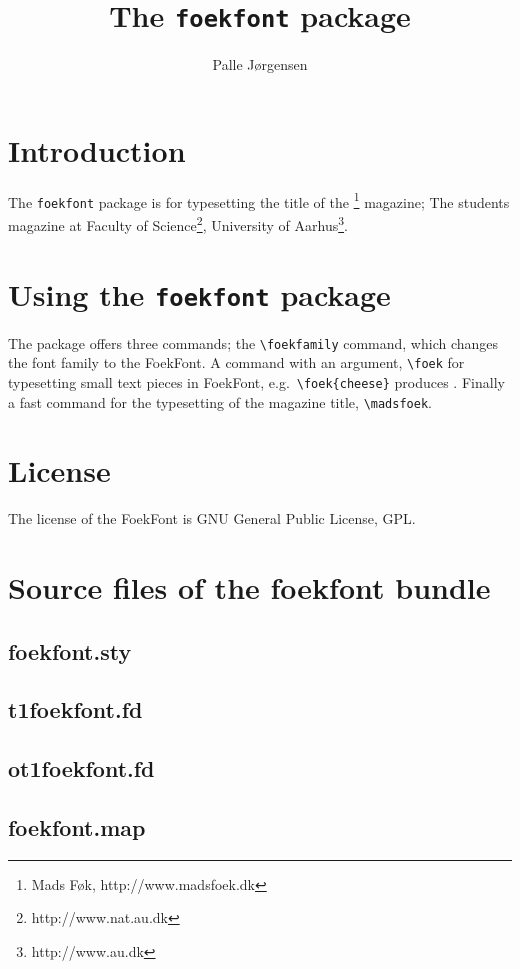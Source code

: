 \documentclass[a4paper,11pt,danish,DIVcalc]{scrartcl}
\author{Palle Jørgensen}
\title{The \texttt{foekfont} package}
\newcommand*\sourcefile[1]{\subsection{#1}
  }
\begin{document}
\maketitle


\section{Introduction}
\label{sec:introduction}

The \texttt{foekfont} package is for typesetting the title of the
\madsfoek\footnote{Mads Føk, http://www.madsfoek.dk} magazine; The
students magazine at Faculty of
Science\footnote{http://www.nat.au.dk}, University of
Aarhus\footnote{http://www.au.dk}.


\section{Using the \texttt{foekfont} package}
\label{sec:using-madsf-pack}

The package offers three commands; the \verb+\foekfamily+ command,
which changes the font family to the FoekFont. A command with an argument,
\verb+\foek+ for typesetting small text pieces in FoekFont, e.g.\
\verb++ produces \foek{cheese}. Finally a fast command
for the typesetting of the magazine title, \verb+\madsfoek+.

\section{License}
\label{sec:license}

The license of the FoekFont is GNU General Public License, GPL.
\clearpage
\appendix

\section{Source files of the foekfont bundle}
\label{sec:source-files-madsf}

\sourcefile{foekfont.sty}
\sourcefile{t1foekfont.fd}
\sourcefile{ot1foekfont.fd}
\sourcefile{foekfont.map}
\end{document}

